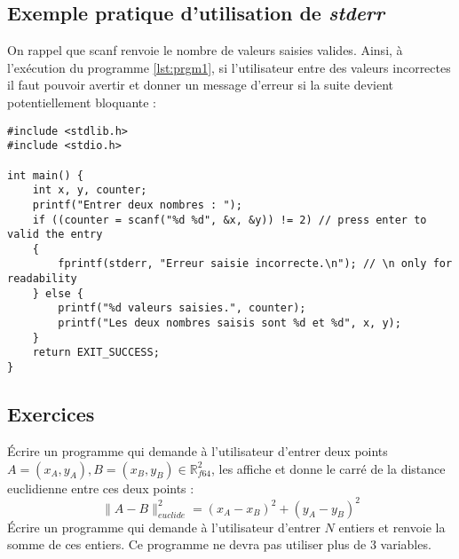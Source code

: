 \documentclass[../../../main.tex]{subfiles}
\begin{document}
\subsection{Exemple pratique d'utilisation de \textit{stderr}}
On rappel que \textsf{scanf} renvoie le nombre de valeurs saisies valides. Ainsi, à l'exécution du programme \ref{lst:prgm1}, si l'utilisateur entre des valeurs incorrectes il faut pouvoir avertir et donner un message d'erreur si la suite devient potentiellement bloquante :
	\begin{verbatim}
#include <stdlib.h>
#include <stdio.h>

int main() {
	int x, y, counter;
	printf("Entrer deux nombres : ");
	if ((counter = scanf("%d %d", &x, &y)) != 2) // press enter to valid the entry
	{
		fprintf(stderr, "Erreur saisie incorrecte.\n"); // \n only for readability
	} else {
		printf("%d valeurs saisies.", counter);
		printf("Les deux nombres saisis sont %d et %d", x, y);
	}
	return EXIT_SUCCESS;
}
	\end{verbatim}
\subsection{Exercices}
Écrire un programme qui demande à l'utilisateur d'entrer deux points $A = (x_{A}, y_{A}), B = (x_{B}, y_{B})\in{\mathbb{R}_{f64}^{2}}$, les affiche et donne le carré de la distance euclidienne entre ces deux points :
$$\lVert{A - B}\rVert^{2}_{euclide} = (x_{A} - x_{B})^{2} + (y_{A} - y_{B})^{2}$$
Écrire un programme qui demande à l'utilisateur d'entrer $N$ entiers et renvoie la somme de ces entiers. Ce programme ne devra pas utiliser plus de 3 variables.
\end{document}
